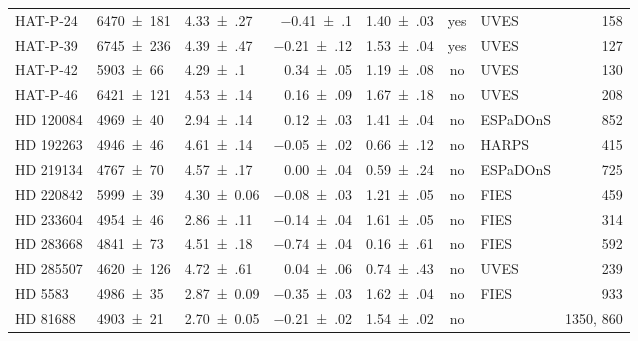\documentclass[fleqn]{fcup-thesis}
\newcommand{\object}[1]{#1}
\begin{document}
\begin{landscape}
\begin{ThreePartTable}
\begin{longtable}{lllrlclr}
        \object{HAT-P-24}       &   \num{6470(181)}   &  \num{4.33(27)}             &  \num{-0.41(10)}  &  \num{1.40(03)}  & yes  &  UVES             &  158  \\
        \object{HAT-P-39}       &   \num{6745(236)}   &  \num{4.39(47)}             &  \num{-0.21(12)}  &  \num{1.53(04)}  & yes  &  UVES             &  127  \\
        \object{HAT-P-42}       &   \num{5903(66)}    &  \num{4.29(10)}\tnote{a}    &  \num{ 0.34(05)}  &  \num{1.19(08)}  & no   &  UVES             &  130  \\
        \object{HAT-P-46}       &   \num{6421(121)}   &  \num{4.53(14)}\tnote{a}    &  \num{ 0.16(09)}  &  \num{1.67(18)}  & no   &  UVES             &  208  \\[5pt]
        \object{HD 120084}      &   \num{4969(40)}    &  \num{2.94(14)}\tnote{a}    &  \num{ 0.12(03)}  &  \num{1.41(04)}  & no   &  ESPaDOnS         &  852  \\
        \object{HD 192263}      &   \num{4946(46)}    &  \num{4.61(14)}             &  \num{-0.05(02)}  &  \num{0.66(12)}  & no   &  HARPS            &  415  \\
        \object{HD 219134}      &   \num{4767(70)}    &  \num{4.57(17)}             &  \num{ 0.00(04)}  &  \num{0.59(24)}  & no   &  ESPaDOnS         &  725  \\
        \object{HD 220842}      &   \num{5999(39)}    &  \num{4.30(6)}\tnote{a}     &  \num{-0.08(03)}  &  \num{1.21(05)}  & no   &  FIES             &  459  \\
        \object{HD 233604}      &   \num{4954(46)}    &  \num{2.86(11)}\tnote{a}    &  \num{-0.14(04)}  &  \num{1.61(05)}  & no   &  FIES             &  314  \\
        \object{HD 283668}      &   \num{4841(73)}    &  \num{4.51(18)}             &  \num{-0.74(04)}  &  \num{0.16(61)}  & no   &  FIES             &  592  \\
        \object{HD 285507}      &   \num{4620(126)}   &  \num{4.72(61)}             &  \num{ 0.04(06)}  &  \num{0.74(43)}  & no   &  UVES             &  239  \\
        \object{HD 5583}        &   \num{4986(35)}    &  \num{2.87(9)}\tnote{a}     &  \num{-0.35(03)}  &  \num{1.62(04)}  & no   &  FIES             &  933  \\
        \object{HD 81688}       &   \num{4903(21)}    &  \num{2.70(5)}\tnote{a}     &  \num{-0.21(02)}  &  \num{1.54(02)}  & no   & \tnote{b}         & 1350, 860  \\

\end{longtable}
\end{ThreePartTable}
\end{landscape}
\end{document}
